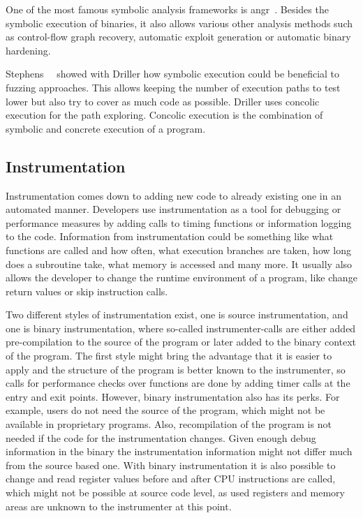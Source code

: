 One of the most famous symbolic analysis frameworks is angr~\cite{angrpaper}.
Besides the symbolic execution of binaries, it also allows various other
analysis methods such as control-flow graph recovery, automatic exploit
generation or automatic binary hardening.

Stephens~\etal~\cite{driller} showed with Driller how symbolic execution could
be beneficial to fuzzing approaches. This allows keeping the number of execution
paths to test lower but also try to cover as much code as possible. Driller uses
concolic execution for the path exploring. Concolic execution is the combination
of symbolic and concrete execution of a program.

\subsection{Instrumentation}

Instrumentation comes down to adding new code to already existing one in an
automated manner. Developers use instrumentation as a tool for debugging or
performance measures by adding calls to timing functions or information logging
to the code. Information from instrumentation could be something like what
functions are called and how often, what execution branches are taken, how long
does a subroutine take, what memory is accessed and many more. It usually also
allows the developer to change the runtime environment of a program, like change
return values or skip instruction calls.

Two different styles of instrumentation exist, one is source instrumentation,
and one is binary instrumentation, where so-called instrumenter-calls are either
added pre-compilation to the source of the program or later added to the binary
context of the program. The first style might bring the advantage that it is
easier to apply and the structure of the program is better known to the
instrumenter, so calls for performance checks over functions are done by adding
timer calls at the entry and exit points. However, binary instrumentation also
has its perks. For example, users do not need the source of the program, which
might not be available in proprietary programs. Also, recompilation of the
program is not needed if the code for the instrumentation changes. Given enough
debug information in the binary the instrumentation information might not differ
much from the source based one. With binary instrumentation it is also possible
to change and read register values before and after CPU instructions are called,
which might not be possible at source code level, as used registers and memory
areas are unknown to the instrumenter at this point.

